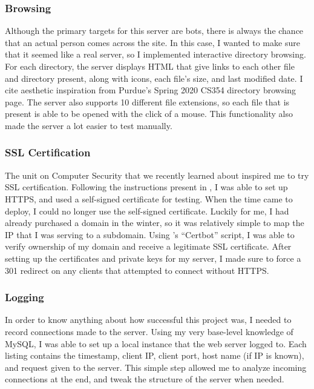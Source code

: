 \documentclass[12pt]{article}
\begin{document}
\subsubsection{Browsing}
Although the primary targets for this server are bots, there is always the chance that an actual person comes across the site.
In this case, I wanted to make sure that it seemed like a real server, so I implemented interactive directory browsing.
For each directory, the server displays HTML that give links to each other file and directory present, along with icons, each file's size, and last modified date.
I cite aesthetic inspiration from Purdue's Spring 2020 CS354 directory browsing page.
The server also supports 10 different file extensions, so each file that is present is able to be opened with the click of a mouse.
This functionality also made the server a lot easier to test manually.

\subsubsection{SSL Certification}
The unit on Computer Security that we recently learned about inspired me to try SSL certification.
Following the instructions present in , I was able to set up HTTPS, and used a self-signed certificate for testing.
When the time came to deploy, I could no longer use the self-signed certificate.
Luckily for me, I had already purchased a domain in the winter, so it was relatively simple to map the IP that I was serving to a subdomain.
Using \textcite{letsencrypt}'s ``Certbot'' script, I was able to verify ownership of my domain and receive a legitimate SSL certificate.
After setting up the certificates and private keys for my server, I made sure to force a 301 redirect on any clients that attempted to connect without HTTPS.

\subsubsection{Logging}
In order to know anything about how successful this project was, I needed to record connections made to the server.
Using my very base-level knowledge of MySQL, I was able to set up a local instance that the web server logged to.
Each listing contains the timestamp, client IP, client port, host name (if IP is known), and request given to the server.
This simple step allowed me to analyze incoming connections at the end, and tweak the structure of the server when needed.
\end{document}
